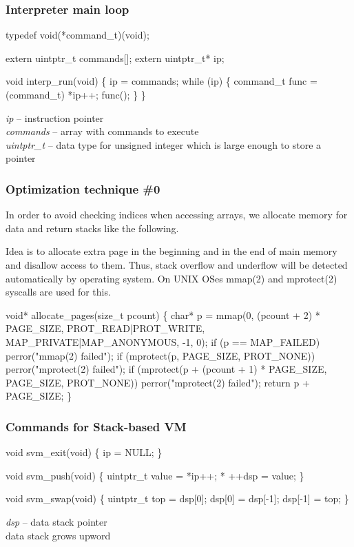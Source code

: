 \documentclass[hyperref={colorlinks=true},xcolor=table]{beamer}
\begin{document}
\begin{frame}[fragile]
  \frametitle{Interpreter main loop}
  \begin{CodeNoLabel}
typedef void(*command_t)(void);

extern uintptr_t commands[];
extern uintptr_t* ip;

void interp_run(void) \{
    ip = commands;
    while (ip) \{
        command_t func = (command_t) *ip++;
        func();
    \}
\}
  \end{CodeNoLabel}
  \textit{ip} -- instruction pointer\\
  \textit{commands} -- array with commands to execute\\
  \textit{uintptr\_t} -- data type for unsigned integer which is large
  enough to store a pointer
\end{frame}

\footnotesize
\begin{frame}[fragile]
  \frametitle{Optimization technique \#0}
  In order to avoid checking indices when accessing arrays, we
  allocate memory for data and return stacks like the following.

  Idea is to allocate extra page in the beginning and in the end of
  main memory and disallow access to them. Thus, stack overflow and
  underflow will be detected automatically by operating system. On
  UNIX OSes mmap(2) and mprotect(2) syscalls are used for this.

  \begin{CodeNoLabel}
void* allocate_pages(size_t pcount) \{
    char* p = mmap(0, (pcount + 2) * PAGE_SIZE,
        PROT_READ|PROT_WRITE,
        MAP_PRIVATE|MAP_ANONYMOUS, -1, 0);
    if (p == MAP_FAILED)
        perror("mmap(2) failed");
    if (mprotect(p, PAGE_SIZE, PROT_NONE))
        perror("mprotect(2) failed");
    if (mprotect(p + (pcount + 1) * PAGE_SIZE,
        PAGE_SIZE, PROT_NONE))
        perror("mprotect(2) failed");
    return p + PAGE_SIZE;
\}
  \end{CodeNoLabel}
\end{frame}
\normalsize

\begin{frame}[fragile]
  \frametitle{Commands for Stack-based VM}
  \begin{CodeNoLabel}
void svm_exit(void) \{
    ip = NULL;
\}

void svm_push(void) \{
    uintptr_t value = *ip++;
    * ++dsp = value;
\}

void svm_swap(void) \{
    uintptr_t top = dsp[0];
    dsp[0] = dsp[-1];
    dsp[-1] = top;
\}
  \end{CodeNoLabel}
  \textit{dsp} -- data stack pointer\\
  data stack grows upword
\end{frame}
\end{document}
